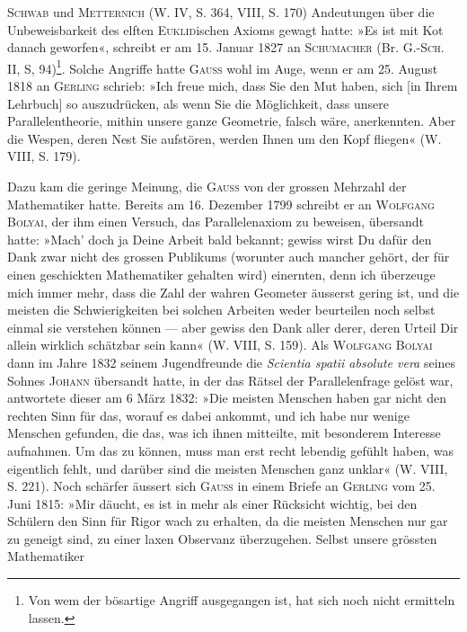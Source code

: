 \textsc{Schwab} und \textsc{Metternich} (W. IV, S. 364, VIII, S. 170) Andeutungen über die
Unbeweisbarkeit des elften \textsc{Euklid}ischen Axioms gewagt hatte: »Es ist mit
\clearpage{}\setcounter{footnote}{0}
\noindent Kot danach geworfen«, schreibt er am 15. Januar 1827 an \textsc{Schumacher} (Br.
G.-\textsc{Sch.} II, S, 94)\footnote{Von wem der bösartige Angriff ausgegangen ist, hat sich noch nicht ermitteln lassen.}.
Solche Angriffe hatte \textsc{Gauss} wohl im Auge, wenn er
am 25. August 1818 an \textsc{Gerling} schrieb: »Ich freue mich, dass Sie den Mut
haben, sich [in Ihrem Lehrbuch] so auszudrücken, als wenn Sie die Möglichkeit,
dass unsere Parallelentheorie, mithin unsere ganze Geometrie, falsch
wäre, anerkennten. Aber die Wespen, deren Nest Sie aufstören, werden
Ihnen um den Kopf fliegen« (W. VIII, S. 179).
\par
Dazu kam die geringe Meinung, die \textsc{Gauss} von der grossen Mehrzahl der
Mathematiker hatte. Bereits am 16. Dezember 1799 schreibt er an \textsc{Wolfgang
Bolyai}, der ihm einen Versuch, das Parallelenaxiom zu beweisen, übersandt
hatte: »Mach’ doch ja Deine Arbeit bald bekannt; gewiss wirst Du dafür den
Dank zwar nicht des grossen Publikums (worunter auch mancher gehört, der
für einen geschickten Mathematiker gehalten wird) einernten, denn ich überzeuge
mich immer mehr, dass die Zahl der wahren Geometer äusserst gering
ist, und die meisten die Schwierigkeiten bei solchen Arbeiten weder beurteilen
noch selbst einmal sie verstehen können — aber gewiss den Dank aller derer,
deren Urteil Dir allein wirklich schätzbar sein kann« (W. VIII, S. 159). Als
\textsc{Wolfgang Bolyai} dann im Jahre 1832 seinem Jugendfreunde die \textit{Scientia
spatii absolute vera} seines Sohnes \textsc{Johann} übersandt hatte, in der das Rätsel
der Parallelenfrage gelöst war, antwortete dieser am 6 März 1832: »Die
meisten Menschen haben gar nicht den rechten Sinn für das, worauf es dabei
ankommt, und ich habe nur wenige Menschen gefunden, die das, was ich
ihnen mitteilte, mit besonderem Interesse aufnahmen. Um das zu können,
muss man erst recht lebendig gefühlt haben, was eigentlich fehlt, und darüber
sind die meisten Menschen ganz unklar« (W. VIII, S. 221). Noch schärfer
äussert sich \textsc{Gauss} in einem Briefe an \textsc{Gerling} vom 25. Juni 1815: »Mir däucht,
es ist in mehr als einer Rücksicht wichtig, bei den Schülern den Sinn für
Rigor wach zu erhalten, da die meisten Menschen nur gar zu geneigt sind,
zu einer laxen Observanz überzugehen. Selbst unsere grössten Mathematiker
